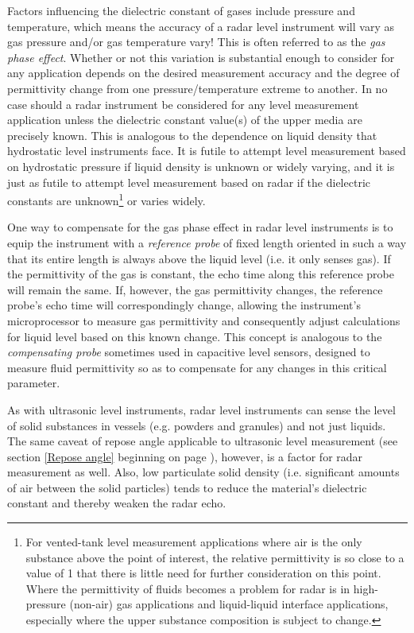 Factors influencing the dielectric constant of gases include pressure and temperature, which means the accuracy of a radar level instrument will vary as gas pressure and/or gas temperature vary!  This is often referred to as the \textit{gas phase effect}.  Whether or not this variation is substantial enough to consider for any application depends on the desired measurement accuracy and the degree of permittivity change from one pressure/temperature extreme to another.  In no case should a radar instrument be considered for any level measurement application unless the dielectric constant value(s) of the upper media are precisely known.  This is analogous to the dependence on liquid density that hydrostatic level instruments face.  It is futile to attempt level measurement based on hydrostatic pressure if liquid density is unknown or widely varying, and it is just as futile to attempt level measurement based on radar if the dielectric constants are unknown\footnote{For vented-tank level measurement applications where air is the only substance above the point of interest, the relative permittivity is so close to a value of 1 that there is little need for further consideration on this point.  Where the permittivity of fluids becomes a problem for radar is in high-pressure (non-air) gas applications and liquid-liquid interface applications, especially where the upper substance composition is subject to change.} or varies widely.  

One way to compensate for the gas phase effect in radar level instruments is to equip the instrument with a \textit{reference probe} of fixed length oriented in such a way that its entire length is always above the liquid level (i.e. it only senses gas).  If the permittivity of the gas is constant, the echo time along this reference probe will remain the same.  If, however, the gas permittivity changes, the reference probe's echo time will correspondingly change, allowing the instrument's microprocessor to measure gas permittivity and consequently adjust calculations for liquid level based on this known change.  This concept is analogous to the \textit{compensating probe} sometimes used in capacitive level sensors, designed to measure fluid permittivity so as to compensate for any changes in this critical parameter.  

\vskip 10pt

As with ultrasonic level instruments, radar level instruments can sense the level of solid substances in vessels (e.g. powders and granules) and not just liquids.  The same caveat of repose angle applicable to ultrasonic level measurement (see section \ref{Repose angle} beginning on page \pageref{Repose angle}), however, is a factor for radar measurement as well.  Also, low particulate solid density (i.e. significant amounts of air between the solid particles) tends to reduce the material's dielectric constant and thereby weaken the radar echo.

